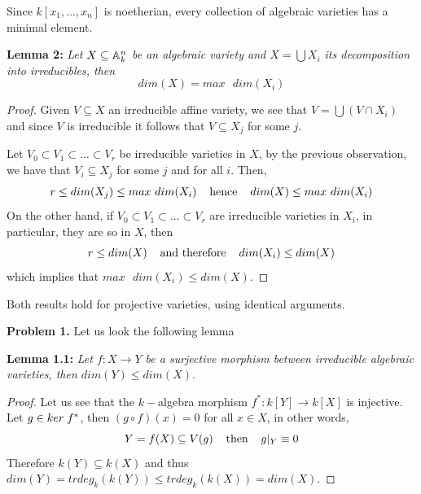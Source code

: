 \documentclass{article}
\begin{document}
Since $k[x_{1},\dots,x_{n}]$ is noetherian, every collection of algebraic varieties has a minimal
element.

\vspace{2mm}
\noindent\textbf{Lemma 2:} \emph{Let $X\subseteq\mathbb{A}_{k}^{n}$ be an algebraic variety and 
$X=\bigcup X_{i}$ its decomposition into irreducibles, then}
\begin{equation*}
    dim(X)=max \text{ } dim(X_{i})
\end{equation*}

\begin{proof}
    Given $V\subseteq X$ an irreducible affine variety, we see that $V=\bigcup(V\cap X_{i})$ and
    since $V$ is irreducible it follows that $V\subseteq X_{j}$ for some $j$.

    \vspace{2mm}
    Let $V_{0}\subset V_{1}\subset\dots\subset V_{r}$ be irreducible varieties in $X$, by the 
    previous observation, we have that $V_{i}\subseteq X_{j}$ for some $j$ and for all $i$. Then,
    \begin{equation*}
        r\leq dim(X_{j})\leq max \text{ } dim(X_{i})
        \hspace{4mm}\text{hence}\hspace{4mm}
        dim(X)\leq max \text{ } dim(X_{i})
    \end{equation*}
    On the other hand, if $V_{0}\subset V_{1}\subset\dots\subset V_{r}$ are irreducible varieties
    in $X_{i}$, in particular, they are so in $X$, then
    \begin{equation*}
        r\leq dim(X)
        \hspace{4mm}\text{and therefore}\hspace{4mm}
        dim(X_{i})\leq dim(X)
    \end{equation*}
    which implies that $max \text{ } dim(X_{i})\leq dim(X)$.
\end{proof}

Both results hold for projective varieties, using identical arguments.

\vspace{3mm}
\noindent\textbf{Problem 1.} Let us look the following lemma

\vspace{2mm}
\noindent\textbf{Lemma 1.1:} \emph{Let $f:X\to Y$ be a surjective morphism between irreducible 
algebraic varieties, then $dim(Y)\leq dim(X)$}.

\begin{proof}
    Let us see that the $k-$algebra morphism $f^{*}:k[Y]\to k[X]$ is injective. Let 
    $g\in ker\hspace{1mm}f^{*}$, then $(g\circ f)(x)=0$ for all $x\in X$, in other words,
    \begin{equation*}
        Y=f(X)\subseteq V(g) \hspace{4mm}\text{then}\hspace{4mm} g|_{Y}\equiv0
    \end{equation*}
    Therefore $k(Y)\subseteq k(X)$ and thus $dim(Y)=trdeg_{k}(k(Y))\leq trdeg_{k}(k(X))=dim(X)$.
\end{proof}
\end{document}
